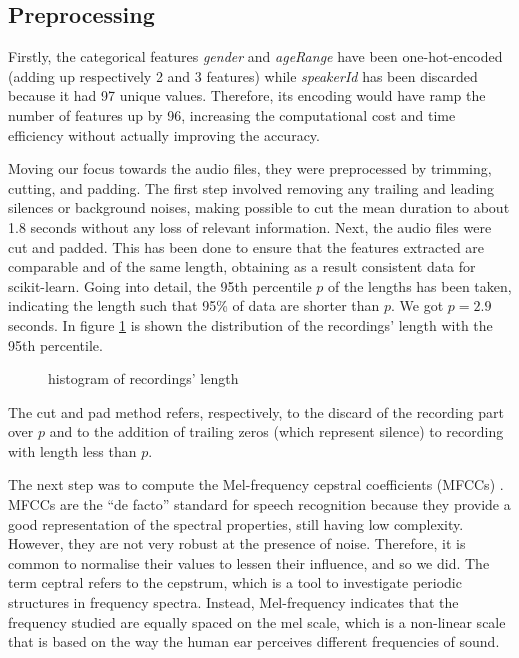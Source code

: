 \documentclass[conference]{IEEEtran}
\begin{document}
\subsection{Preprocessing}

Firstly, the categorical features \textit{gender} and \textit{ageRange} have been one-hot-encoded (adding up respectively 2 and 3 features) while \textit{speakerId} has been discarded because it had 97 unique values.
Therefore, its encoding would have ramp the number of features up by 96, increasing the computational cost and time efficiency without actually improving the accuracy.

Moving our focus towards the audio files, they were preprocessed by trimming, cutting, and padding.
The first step involved removing any trailing and leading silences or background noises, making possible to cut the mean duration to about 1.8 seconds without any loss of relevant information.
Next, the audio files were cut and padded.
This has been done to ensure that the features extracted are comparable and of the same length, obtaining as a result consistent data for scikit-learn.
Going into detail, the 95th percentile $p$ of the lengths has been taken, indicating the length such that 95\% of data are shorter than $p$.
We got $p = 2.9$ seconds.
In figure \ref{fig:perc} is shown the distribution of the recordings' length with the 95th percentile.

\begin{figure}
    \centering
    
    \caption{histogram of recordings' length}
    \label{fig:perc}
\end{figure}

The cut and pad method refers, respectively, to the discard of the recording part over $p$ and to the addition of trailing zeros (which represent silence) to recording with length less than $p$.

The next step was to compute the Mel-frequency cepstral coefficients (MFCCs) \cite{samad:2015}.
MFCCs are the “de facto” standard for speech recognition because they provide a good representation of the spectral properties, still having low complexity.
However, they are not very robust at the presence of noise.
Therefore, it is common to normalise their values to lessen their influence, and so we did.
The term ceptral refers to the cepstrum, which is a tool to investigate periodic structures in frequency spectra.
Instead, Mel-frequency indicates that the frequency studied are equally spaced on the mel scale, which is a non-linear scale that is based on the way the human ear perceives different frequencies of sound.
\end{document}

